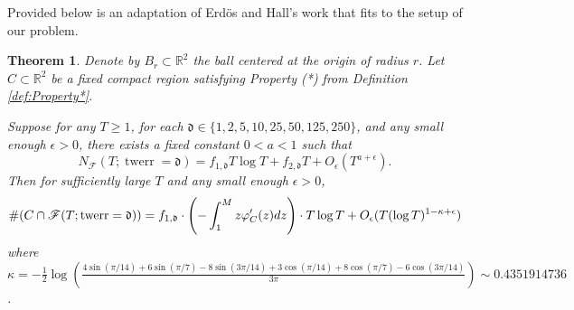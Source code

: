 \documentclass[12pt]{amsart}
\newcounter{counter}[section] %
\numberwithin{equation}{section} %
\newtheorem{theorem}[counter]{Theorem}
\theoremstyle{definition} \newtheorem{definition}[counter]{Definition}
\theoremstyle{remark} \newtheorem{nonexam}[counter]{Non-example}
\newcommand{\FF}{\mathscr{F}} %
\let\originalleft\left \let\originalright\right
\renewcommand{\left}{\mathopen{}\mathclose\bgroup\originalleft}
\renewcommand{\right}{\aftergroup\egroup\originalright}
\DeclareMathOperator{\twerr}{twerr} %
\begin{document}
Provided below is an adaptation of Erd\"os and Hall's work that fits to the setup of our problem.
\begin{theorem} \label{theorem:equidistribution}
    Denote by $B_r \subset \mathbb{R}^2$ the ball centered at the origin of radius $r$. Let $C \subset \mathbb{R}^2$ be a fixed compact region satisfying Property (*) from Definition \ref{def:Property*}.
    
    Suppose for any $T \geq 1$, for each $\mathfrak{d} \in \{1, 2, 5, 10, 25, 50, 125, 250\}$, and any small enough $\epsilon > 0$, there exists a fixed constant $0 < a < 1$ such that
    \begin{equation*}
        N_{\FF}(T; \twerr = \mathfrak{d}) = f_{1,\mathfrak{d}} T \log T + f_{2,\mathfrak{d}} T + O_\epsilon(T^{a + \epsilon}).
    \end{equation*}
    Then for sufficiently large $T$ and any small enough $\epsilon > 0$,
    \begin{equation*}
        \#(C \cap \FF(T; \twerr = \mathfrak{d})) =  f_{1,\mathfrak{d}} \cdot \left( -\int_1^M z \varphi'_C(z)dz \right) \cdot T \log T + O_\epsilon(T (\log T)^{1 - \kappa + \epsilon})
    \end{equation*}
    where $\kappa = -\frac{1}{2} \log(\frac{4 \sin(\pi/14) + 6\sin(\pi/7) - 8 \sin(3\pi/14) + 3 \cos(\pi/14) + 8 \cos(\pi/7) - 6 \cos(3\pi/14)}{3\pi}) \sim 0.4351914736$.
\end{theorem}
\end{document}
